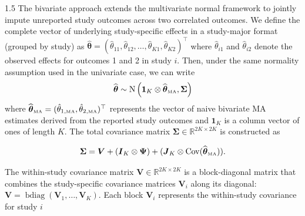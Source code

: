 \documentclass{article}
\begin{document}
\begin{spacing}{1.5}
The bivariate approach extends the multivariate normal framework to jointly impute unreported study outcomes across two correlated outcomes. We define the complete vector of underlying study-specific effects in a study-major format (grouped by study) as $\widehat{\boldsymbol{\theta}} = (\hat{\theta}_{11}, \hat{\theta}_{12}, \dots, \hat{\theta}_{K1}, \hat{\theta}_{K2})^\top$ where $\hat{\theta}_{i1}$ and $\hat{\theta}_{i2}$ denote the observed effects for outcomes 1 and 2 in study $i$. Then, under the same normality assumption used in the univariate case, we can write
\begin{equation*}
    \widehat{\boldsymbol{\theta}} 
\sim \operatorname{N}\left( \boldsymbol{1}_K \otimes \widehat{\boldsymbol{\theta}}_{\tiny{\mbox{MA}}}, \boldsymbol{\Sigma} \right)
\end{equation*}
where $\widehat{\boldsymbol{\theta}}_{\tiny{\mbox{MA}}} = (\hat{\theta}_{1,\tiny{\mbox{MA}}}, \hat{\theta}_{2,\tiny{\mbox{MA}}})^\top$ represents the vector of naive bivariate MA estimates derived from the reported study outcomes and $\boldsymbol{1}_K$ is a column vector of ones of length $K$. 
The total covariance matrix $\boldsymbol{\Sigma} \in \mathbb{R}^{2K \times 2K}$ is constructed as

\begin{equation*} 
\label{eq:sigma_multi_rem} \boldsymbol{\Sigma} = \boldsymbol{V} + (\boldsymbol{I}_K \otimes \boldsymbol{\Psi}) + (\boldsymbol{J}_K \otimes \operatorname{Cov}(\widehat{\boldsymbol{\theta}}_{\tiny{\mbox{MA}}})). 
\end{equation*}

The within-study covariance matrix $\boldsymbol{V} \in \mathbb{R}^{2K \times 2K}$ is a block-diagonal matrix that combines the study-specific covariance matrices $\boldsymbol{V}_i$ along its diagonal: $\boldsymbol{V} = \operatorname{bdiag}(\boldsymbol{V}_1, \dots, \boldsymbol{V}_K)$. Each block $\boldsymbol{V}_i$ represents the within-study covariance for study $i$


\end{spacing}
\end{document}

